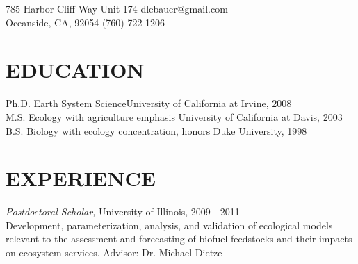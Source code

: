 \documentclass[line,10pt]{res}
\begin{document}

 
\begin{resume}

785 Harbor Cliff Way Unit 174 \hfill dlebauer@gmail.com\\
Oceanside, CA, 92054 \hfill (760) 722-1206\\


\section{EDUCATION}

 Ph.D. Earth System Science\hfill University of California at Irvine, 2008 \\
 M.S. Ecology with agriculture emphasis \hfill University of California at Davis, 2003   \\ 
 B.S. Biology with ecology concentration, honors \hfill Duke University, 1998 

\section{EXPERIENCE}
               {\sl  Postdoctoral Scholar, } \hfill University of Illinois, 2009 - 2011 \\
  Development, parameterization, analysis, and validation of ecological models relevant to the assessment and forecasting of biofuel feedstocks and their impacts on ecosystem services.
  Advisor: Dr. Michael Dietze
		

\end{resume}
\end{document}
